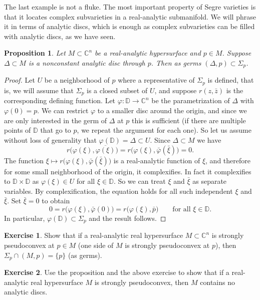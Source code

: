 \documentclass[12pt,openany]{book}
\newcommand{\C}{{\mathbb{C}}}
\newcommand{\D}{{\mathbb{D}}}
\theoremstyle{plain}
\newtheorem{prop}[thm]{Proposition}
\theoremstyle{remark}
\theoremstyle{definition}
\newenvironment{exbox}{%
    \def\FrameCommand{\vrule width 1pt \relax\hspace {10pt}}%
    \MakeFramed {\advance \hsize -\width \FrameRestore }%
}{%
    \endMakeFramed
}
\theoremstyle{exercise}
\newtheorem{exercise}{Exercise}[section]
\theoremstyle{example}
\begin{document}
The last example is not a fluke.
The most important property of Segre varieties is that it locates complex
subvarieties in a real-analytic submanifold.
We will phrase it in terms of analytic discs, which is
enough as complex subvarieties can be filled with analytic discs,
as we have seen.

\begin{prop}
Let $M \subset \C^n$ be a real-analytic hypersurface and $p \in M$.
Suppose $\Delta \subset M$ is a nonconstant analytic disc
through $p$.  Then as germs $(\Delta,p) \subset \Sigma_p$.
\end{prop}

\begin{proof}
Let $U$ be a neighborhood of $p$ where a representative
of $\Sigma_p$ is defined, that is, we will assume that $\Sigma_p$ is
a closed subset of $U$, and suppose $r(z,\bar{z})$ is the corresponding
defining function.
Let $\varphi \colon \D \to \C^n$ be the parametrization of $\Delta$
with $\varphi(0) = p$.  We can restrict $\varphi$ to a smaller disc around the
origin, and since we are only interested in the germ of $\Delta$ at $p$ this
is sufficient (if there are multiple points of $\D$
that go to $p$, we repeat the argument for each one).
So let us assume without loss of generality that $\varphi(\D) = \Delta \subset U$.
Since $\Delta \subset M$ we have
\begin{equation*}
r\bigl(\varphi(\xi),\overline{\varphi(\xi)}\bigr) =
r\bigl(\varphi(\xi),\bar{\varphi}(\bar{\xi})\bigr) = 0 .
\end{equation*}
The function $\xi \mapsto
r\bigl(\varphi(\xi),\bar{\varphi}(\bar{\xi})\bigr)$ is a real-analytic
function of $\xi$, and therefore for some
small neighborhood of the origin, it complexifies.  In fact it complexifies
to $\D \times \D$ as $\varphi(\xi) \in U$ for all $\xi \in \D$.
So we can treat $\xi$ and $\bar{\xi}$ as separate variables.  By
complexification, the equation holds for all such independent
$\xi$ and $\bar{\xi}$.  Set $\bar{\xi} = 0$ to obtain
\begin{equation*}
0 =
r\bigl(\varphi(\xi),\bar{\varphi}(0)\bigr) =
r\bigl(\varphi(\xi),\bar{p}\bigr) 
\qquad \text{for all $\xi \in \D$}.
\end{equation*}
In particular, $\varphi(\D) \subset \Sigma_p$ and the result follows.
\end{proof}

\begin{exbox}
\begin{exercise}
Show that if a real-analytic real hypersurface $M \subset \C^n$ is strongly
pseudoconvex at $p \in M$ (one side of $M$ is strongly pseudoconvex at $p$),
then $\Sigma_p \cap
(M,p) = \{p\}$ (as germs).
\end{exercise}

\begin{exercise}
Use the proposition and the above exercise to show that if a real-analytic
real hypersurface $M$ is strongly 
pseudoconvex, then $M$ contains no analytic discs.
\end{exercise}
\end{exbox}
\end{document}

